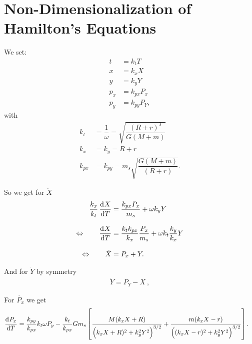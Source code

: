 \chapter{Non-Dimensionalization of Hamilton's Equations} \label{app:non-dimensionalization}
We set:
\begin{align}
t &= k_t T \\
x &= k_x X \\
y &= k_y Y \\
p_x &= k_{px} P_x \\
p_y &= k_{py} P_Y ,
\end{align}
with
\begin{align}
k_t &= \dfrac{1}{\omega} = \sqrt{\dfrac{(R+r)^3}{G(M+m)}} \\[0.5cm]
k_x &= k_y = R+r \\[0.5cm]
k_{px} &= k_{py} = m_s \sqrt{\dfrac{G(M+m)}{(R+r)}} .
\end{align}

So we get for $\dot{X}$
\begin{align}
\dfrac{k_x}{k_t} \dod{X}{T} &= \dfrac{k_{px} P_x}{m_s} + \omega k_y Y \\[0.3cm]
\Leftrightarrow \qquad \dod{X}{T} &= \dfrac{k_t k_{px}}{k_x} \dfrac{P_x}{m_s} + \omega k_t \dfrac{k_y}{k_x} Y \\[0.3cm]
\Leftrightarrow \qquad \dot{X} &= P_x + Y .
\end{align}

And for $\dot{Y}$ by symmetry
\begin{align}
\dot{Y} = P_Y - X \ ,
\end{align}

For $\dot{P_x}$ we get
\begin{align}
\dod{P_x}{T} &= \dfrac{k_{py}}{k_{px}} k_t\omega P_y - \dfrac{k_t}{k_{px}}G m_s \left[\dfrac{M(k_x X + R)}{\left(k_x X + R)^2 + k_y^2 Y^2\right)^{3/2}} + \dfrac{m (k_x X - r)}{\left((k_x X - r)^2 + k_y^2 Y^2\right)^{3/2}} \right].
\end{align}

